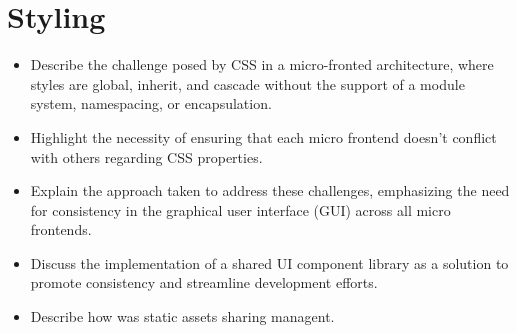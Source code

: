 \section{Styling}
\begin{itemize}
   \item Describe the challenge posed by CSS in a micro-fronted architecture, where styles are global, inherit, and cascade without the support of a module system, namespacing, or encapsulation.
   \item Highlight the necessity of ensuring that each micro frontend doesn't conflict with others regarding CSS properties.
   \item Explain the approach taken to address these challenges, emphasizing the need for consistency in the graphical user interface (GUI) across all micro frontends.
   \item Discuss the implementation of a shared UI component library as a solution to promote consistency and streamline development efforts.
   \item Describe how was static assets sharing managent.
\end{itemize}